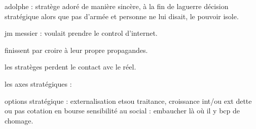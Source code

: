 \documentclass[a4paper,12pt]{article}
\begin{document}
 adolphe : stratège adoré de manière sincère, à la fin de laguerre décision stratégique alors que pas d'armée
 et personne ne lui disait, le pouvoir isole.
 
 jm messier : voulait prendre le control d'internet.
 
 finissent par croire à leur propre propagandes.
 
 les stratèges perdent le contact avc le réel.
 
 
 les axes stratégiques : 
 
 options stratégique : 
 externalisation etsou traitance,
 croissance int/ou ext
 dette ou pas
 cotation en bourse
 sensibilité au social : embaucher là où il y bcp de chomage.
 
 
 
 
 
  
%
%

\newpage
\nocite{*}  %


%
%
%
%
\end{document}
